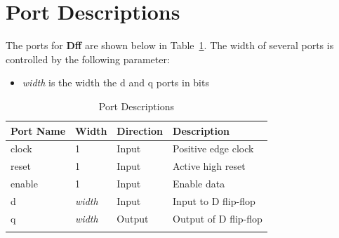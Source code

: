 \section{Port Descriptions}

The ports for \textbf{Dff} are shown below in
Table~\ref{table:ports}. The width of several ports is controlled
by the following parameter:

\begin{itemize}[noitemsep]
  \item \textit{width} is the width the d and q ports in bits
\end{itemize}

\renewcommand*{\arraystretch}{1.4}
\begin{longtable}[H]{
    | p{}
    | p{}
    | p{}
    | p{} |
  }
  \hline
  \textbf{Port Name} &
  \textbf{Width}     &
  \textbf{Direction} &
  \textbf{Description}  \\ \hline \hline

  clock              &
  1                  &
  Input              &
  Positive edge clock   \\ \hline

  reset              &
  1                  &
  Input              &
  Active high reset     \\ \hline

  enable             &
  1                  &
  Input              &
  Enable data           \\ \hline

  d                  &
  \textit{width}     &
  Input              &
  Input to D flip-flop  \\ \hline

  q                  &
  \textit{width}     &
  Output             &
  Output of D flip-flop \\ \hline

  \caption{Port Descriptions}\label{table:ports}
\end{longtable}

